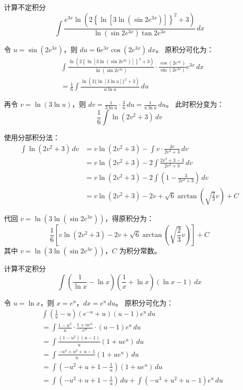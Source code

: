 \begin{questions}
\question 计算不定积分
\[
\int \frac{e^{3x} \ln\left( 2 \left\{ \ln\left[ 3 \ln(\sin 2e^{3x}) \right] \right\}^2 + 3 \right)}{\ln(\sin 2e^{3x}) \tan 2e^{3x}} \,dx
\]
\begin{solution}
令 $u = \sin(2e^{3x})$，则 $du = 6e^{3x} \cos(2e^{3x}) \,dx$。
原积分可化为：
\begin{align*}
&\int \frac{\ln\left( 2 \left\{ \ln\left[ 3 \ln(\sin 2e^{3x}) \right] \right\}^2 + 3 \right)}{\ln(\sin 2e^{3x})} \cdot \frac{\cos(2e^{3x})}{\sin(2e^{3x})} e^{3x} \,dx \\
&= \frac{1}{6} \int \frac{\ln(2 \{ \ln [ 3 \ln u ] \}^2 + 3)}{u \ln u} \,du
\end{align*}

再令 $v = \ln(3\ln u)$，则 $dv = \frac{1}{3\ln u} \cdot \frac{3}{u} \,du = \frac{1}{u\ln u} \,du$。
此时积分变为：
\[
\frac{1}{6} \int \ln(2v^2 + 3) \,dv
\]

使用分部积分法：
\begin{align*}
\int \ln(2v^2 + 3) \,dv &= v \ln(2v^2 + 3) - \int v \cdot \frac{4v}{2v^2 + 3} \,dv \\
&= v \ln(2v^2 + 3) - 2 \int \frac{2v^2 + 3 - 3}{2v^2 + 3} \,dv \\
&= v \ln(2v^2 + 3) - 2 \int \left( 1 - \frac{3}{2v^2 + 3} \right) \,dv \\
&= v \ln(2v^2 + 3) - 2v + \sqrt{6} \arctan\left( \sqrt{\frac{2}{3}}v \right) + C
\end{align*}

代回 $v = \ln(3\ln(\sin 2e^{3x}))$，得原积分为：
\[
\frac{1}{6} \left[ v \ln(2v^2 + 3) - 2v + \sqrt{6} \arctan\left( \sqrt{\frac{2}{3}}v \right) \right] + C
\]
其中 $v = \ln(3\ln(\sin 2e^{3x}))$，$C$ 为积分常数。
\end{solution}

\question 计算不定积分
\[
\int \left( \frac{1}{\ln x} - \ln x \right) \left( \frac{1}{x} + \ln x \right) (\ln x - 1) \,dx
\]
\begin{solution}
令 $u = \ln x$，则 $x = e^u$，$dx = e^u \,du$。
原积分可化为：
\begin{align*}
&\int \left( \frac{1}{u} - u \right) \left( e^{-u} + u \right) (u - 1) e^u \,du \\
&= \int \frac{1 - u^2}{u} \cdot \frac{1 + u e^u}{e^u} \cdot (u - 1) e^u \,du \\
&= \int \frac{(1 - u^2)(u - 1)}{u} (1 + u e^u) \,du \\
&= \int \frac{-u^3 + u^2 + u - 1}{u} (1 + u e^u) \,du \\
&= \int \left( -u^2 + u + 1 - \frac{1}{u} \right) (1 + u e^u) \,du \\
&= \int \left( -u^2 + u + 1 - \frac{1}{u} \right) \,du + \int \left( -u^3 + u^2 + u - 1 \right) e^u \,du
\end{align*}


\end{solution}
\end{questions}
